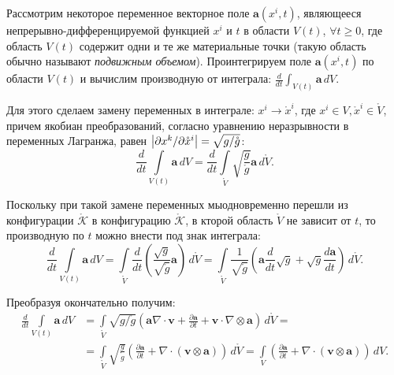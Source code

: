 
Рассмотрим некоторое переменное векторное поле $\mathbf{a}(x^i, t)$, являющееся непрерывно-дифференцируемой функцией $x^i$ и $t$ в области $V(t)$, $\forall t \geqslant 0$, где область $V(t)$ содержит одни и те же материальные точки (такую область обычно называют \textit{подвижным объемом}). Проинтегрируем поле $\mathbf{a}(x^i, t)$ по области $V(t)$ и вычислим производную от интеграла: $\frac{d}{dt} \int_{V(t)} \mathbf{a} \, dV$. 

Для этого сделаем замену переменных в интеграле: $x^i \to \mathring{x}^i$, где $x^i \in V, \mathring{x}^i \in \mathring{V}$, причем якобиан преобразований, согласно уравнению неразрывности в переменных Лагранжа, равен $\abs{\partial x^k / \partial \mathring{x}^i} = \sqrt{g / \mathring{g}}$: 
\begin{equation*}
	\frac{d}{dt} \int\limits_{V(t)} \mathbf{a} \, dV = \frac{d}{dt} \int\limits_{\mathring{V}} \sqrt{\frac{g}{\mathring{g}}} \mathbf{a} \, d\mathring{V}.
\end{equation*} 

Поскольку при такой замене переменных мыодновременно перешли из конфигурации $\mathring{\mathcal{K}}$ в конфигурацию $\mathring{\mathcal{K}}$, в кторой область $\mathring{V}$ не зависит от $t$, то производную по $t$ можно внести под знак интеграла:
\begin{equation*}
	\frac{d}{dt} \int\limits_{V(t)} \mathbf{a} \, dV = \int\limits_{\mathring{V}} \frac{d}{dt} \left(\frac{\sqrt{g}}{\sqrt{\mathring{g}}} \mathbf{a}\right) \, d\mathring{V} = \int\limits_{\mathring{V}} \frac{1}{\sqrt{\mathring{g}}} \left(\mathbf{a} \frac{d}{dt} \sqrt{g} + \sqrt{g} \frac{d\mathbf{a}}{dt}\right) \, d\mathring{V}.
\end{equation*}

Преобразуя окончательно получим:
\begin{align*}
	\frac{d}{dt} \int\limits_{V(t)} \mathbf{a} \, dV &= \int\limits_{\mathring{V}} \sqrt{g / \mathring{g}} \left(\mathbf{a} \nabla \cdot \mathbf{v} + \frac{\partial \mathbf{a}}{\partial t} + \mathbf{v} \cdot \nabla \otimes \mathbf{a}\right) \, d\mathring{V} = \\
	&= \int\limits_{\mathring{V}} \sqrt{\frac{g}{\mathring{g}}} \left(\frac{\partial \mathbf{a}}{\partial t} + \nabla \cdot \left(\mathbf{v} \otimes \mathbf{a}\right)\right) \, d\mathring{V} = \int\limits_{V} \left(\frac{\partial \mathbf{a}}{\partial t} + \nabla \cdot (\mathbf{v} \otimes \mathbf{a})\right) \, dV.
\end{align*}

